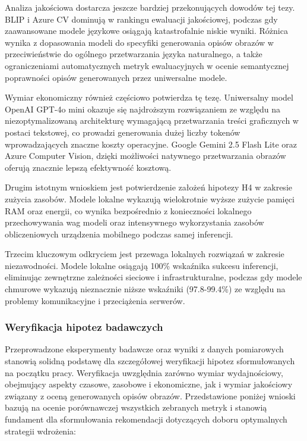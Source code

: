 Analiza jakościowa dostarcza jeszcze bardziej przekonujących dowodów tej tezy. BLIP i Azure CV
dominują w rankingu ewaluacji jakościowej, podczas gdy zaawansowane modele językowe osiągają katastrofalnie niskie wyniki.
Różnica wynika z dopasowania modeli do specyfiki generowania opisów obrazów
w przeciwieństwie do ogólnego przetwarzania języka naturalnego, a także ograniczeniami automatycznych metryk ewaluacyjnych
w ocenie semantycznej poprawności opisów generowanych przez uniwersalne modele.

Wymiar ekonomiczny również częściowo potwierdza tę tezę. Uniwersalny model OpenAI GPT-4o mini okazuje się najdroższym rozwiązaniem
ze względu na niezoptymalizowaną architekturę wymagającą przetwarzania treści graficznych w postaci tekstowej, co prowadzi generowania 
dużej liczby tokenów wprowadzających znaczne koszty operacyjne. Google Gemini 2.5 Flash Lite oraz Azure Computer Vision, dzięki możliwości 
natywnego przetwarzania obrazów oferują znacznie lepszą efektywność kosztową. 

Drugim istotnym wnioskiem jest potwierdzenie założeń hipotezy H4 w zakresie zużycia zasobów.
Modele lokalne wykazują wielokrotnie wyższe zużycie pamięci RAM oraz energii, co wynika bezpośrednio z konieczności lokalnego przechowywania
wag modeli oraz intensywnego wykorzystania zasobów obliczeniowych urządzenia mobilnego podczas samej inferencji.

Trzecim kluczowym odkryciem jest przewaga lokalnych rozwiązań w zakresie niezawodności. 
Modele lokalne osiągają 100\% wskaźnika sukcesu inferencji, eliminując zewnętrzne zależności sieciowe
i infrastrukturalne, podczas gdy modele chmurowe wykazują nieznacznie niższe wskaźniki (97.8-99.4\%)
ze względu na problemy komunikacyjne i przeciążenia serwerów.

\subsubsection{Weryfikacja hipotez badawczych}\label{sss:weryfikacja hipotez}

\noindent
Przeprowadzone eksperymenty badawcze oraz wyniki z danych pomiarowych stanowią solidną podstawę dla szczegółowej weryfikacji hipotez sformułowanych na początku pracy. 
Weryfikacja uwzględnia zarówno wymiar wydajnościowy, obejmujący aspekty czasowe, zasobowe i ekonomiczne, jak i wymiar jakościowy związany z oceną generowanych opisów obrazów.
Przedstawione poniżej wnioski bazują na ocenie porównawczej wszystkich zebranych metryk i stanowią fundament dla sformułowania rekomendacji dotyczących doboru optymalnych strategii wdrożenia:

